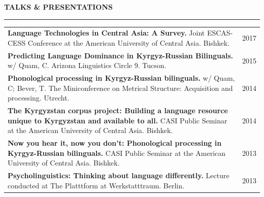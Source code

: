 \documentclass{resume} %
\begin{document}
\begin{minipage}{\textwidth}

\sectionskip
\MakeUppercase{\textbf{Talks \& Presentations}}
  \sectionlineskip
  \hrule
\vspace{.5cm}

\renewcommand{\arraystretch}{1.5} %

\begin{tabular}{@{}p{}p{}@{}}
  {\bf Language Technologies in Central Asia: A Survey.} {Joint ESCAS-CESS Conference at the American University of Central Asia. Bishkek.}
  &
  \hfill {2017}
  \\
  {\bf Predicting Language Dominance in Kyrgyz-Russian Bilinguals.} {w/ Quam, C.} {Arizona Linguistics Circle 9. Tucson.}
  &
  \hfill {2015}
  \\
  {\bf Phonological processing in Kyrgyz-Russian bilinguals.} {w/ Quam, C; Bever, T.} {The Miniconference on Metrical Structure: Acquisition and processing. Utrecht.}
  &
  \hfill {2014}
  \\
  {\bf The Kyrgyzstan corpus project: Building a language resource unique to Kyrgyzstan and available to all.} {CASI Public Seminar at the American University of Central Asia. Bishkek.}
  &
  \hfill {2014}
  \\
  {\bf Now you hear it, now you don’t: Phonological processing in Kyrgyz-Russian bilinguals.} {CASI Public Seminar at the American University of Central Asia. Bishkek.}
  &
  \hfill {2013}
  \\
  {\bf Psycholinguistics: Thinking about language differently.} {Lecture conducted at The Platttform at Werkstatttraum. Berlin.}
  &
  \hfill {2013}
  \\
\end{tabular}

\end{minipage}





\end{document}
